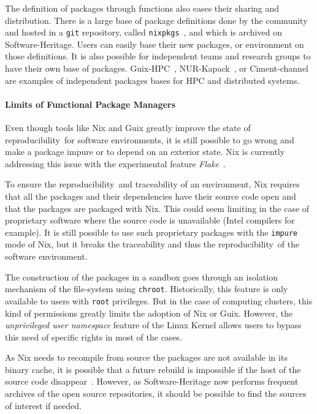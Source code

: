 \documentclass[sigconf,natbib=false]{acmart}
\newcommand{\repro}{reproducibility}
\begin{document}
The definition of packages through functions also eases their sharing and distribution.
There is a large base of package definitions done by the community and hosted in a \texttt{git} repository, called \texttt{nixpkgs}\ \cite{nixpkgs}, and which is archived on Software-Heritage.
Users can easily base their new packages, or environment on those definitions.
It is also possible for independent teams and research groups to have their own base of packages.
Guix-HPC\ \cite{guix-hpc}, NUR-Kapack\ \cite{kapack}, or Ciment-channel\ \cite{ciment_channel} are examples of independent packages bases for HPC and distributed systems.

\paragraph{Limits of Functional Package Managers}

Even though tools like Nix and Guix greatly improve the state of \repro\ for software environments, it is still possible to go wrong and make a package impure or to depend on an exterior state.
Nix is currently addressing this issue with the experimental feature \emph{Flake}\ \cite{flakes}.

To ensure the \repro\ and traceability of an environment, Nix requires that all the packages and their dependencies have their source code open and that the packages are packaged with Nix.
This could seem limiting in the case of proprietary software where the source code is unavailable (Intel compilers for example).
It is still possible to use such proprietary packages with the \texttt{impure} mode of Nix, but it breaks the traceability and thus the \repro\ of the software environment. 

The construction of the packages in a sandbox goes through an isolation mechanism of the file-system using \texttt{chroot}.
Historically, this feature is only available to users with \texttt{root} privileges.
But in the case of computing clusters, this kind of permissions greatly limits the adoption of Nix or Guix.
However, the \emph{unprivileged user namespace} feature of the Linux Kernel allows users to bypass this need of specific rights in most of the cases.

As Nix needs to recompile from source the packages are not available in its binary cache, it is possible that a future rebuild is impossible if the host of the source code disappear\ \cite{blinry}.
However, as Software-Heritage now performs frequent archives of the open source repositories, it should be possible to find the sources of interest if needed.
\end{document}
